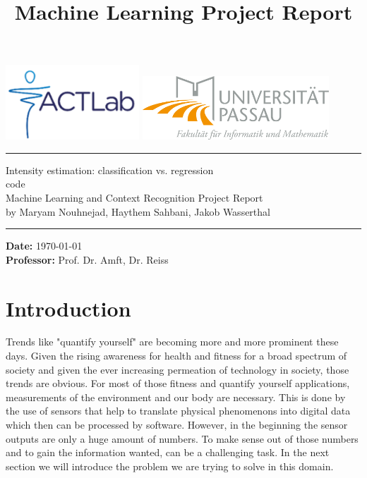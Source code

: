 \documentclass[12pt, a4paper, onecolumn, oneside, parskip=half]{scrartcl}
\title{Machine Learning Project Report}
\newcommand{\authors}{Maryam Nouhnejad, Haythem Sahbani, Jakob Wasserthal
} %
\newcommand{\prof}{Prof. Dr. Amft, Dr. Reiss} %
\newcommand{\doctitle}{Machine Learning and Context Recognition Project Report} %
\newcommand{\subcode}{code} %
\newcommand{\docsubject}{Intensity estimation: classification vs. regression} %
\newcommand{\HRule}[2]{\noindent\rule[#1]{\linewidth}{#2}}
\newcommand{\vlinespace}[1]{\vspace*{#1\baselineskip}}
\begin{document}
\begin{titlepage}

\sffamily
\includegraphics[width=5cm]{pictures/actlabLogo.png}
\hfill \centering
\includegraphics[width=7cm]{pictures/uplogo.png}
\HRule{10pt}{2pt}

\vfill
\Large{\docsubject{} \\\subcode{} \\}
\vlinespace{1}
\huge{\doctitle{}\\}
\vlinespace{10}
\vfill
\large
by \authors{}\\
\vfill
\HRule{10pt}{2pt}
\raggedright
\textbf{Date: } \today{} \\
\textbf{Professor:} \prof{}

\end{titlepage}

\tableofcontents
\newpage
\pagestyle{scrheadings}



\section{Introduction}
Trends like "quantify yourself" are becoming more and more prominent these days. Given the rising awareness for health and fitness for a broad spectrum of society and given the ever increasing permeation of technology in society, those trends are obvious. For most of those fitness and quantify yourself applications, measurements of the environment and our body are necessary. This is done by the use of sensors that help to translate physical phenomenons into digital data which then can be processed by software. However, in the beginning the sensor outputs are only a huge amount of numbers. To make sense out of those numbers and to gain the information wanted, can be a challenging task. In the next section we will introduce the problem we are trying to solve in this domain.
\end{document}
